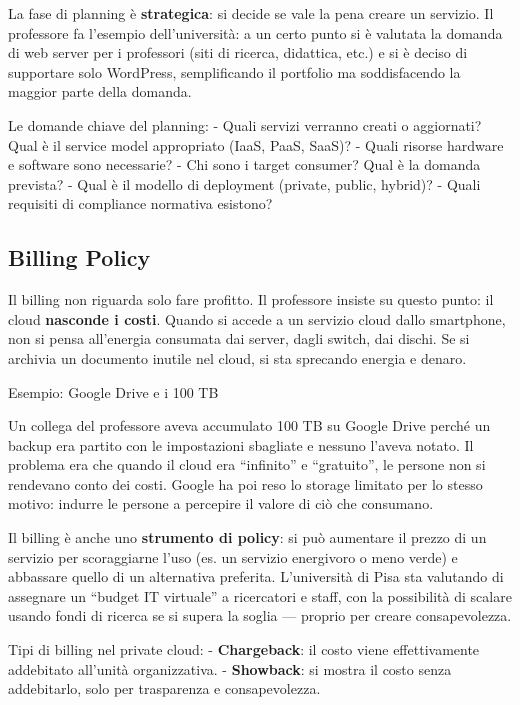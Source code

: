 \documentclass[
  italian,
  openany]{book}
\begin{document}
La fase di planning è \textbf{strategica}: si decide se vale la pena
creare un servizio. Il professore fa l'esempio dell'università: a un
certo punto si è valutata la domanda di web server per i professori
(siti di ricerca, didattica, etc.) e si è deciso di supportare solo
WordPress, semplificando il portfolio ma soddisfacendo la maggior parte
della domanda.

Le domande chiave del planning: - Quali servizi verranno creati o
aggiornati? Qual è il service model appropriato (IaaS, PaaS, SaaS)? -
Quali risorse hardware e software sono necessarie? - Chi sono i target
consumer? Qual è la domanda prevista? - Qual è il modello di deployment
(private, public, hybrid)? - Quali requisiti di compliance normativa
esistono?

\subsection{Billing Policy}\label{billing-policy}

Il billing non riguarda solo fare profitto. Il professore insiste su
questo punto: il cloud \textbf{nasconde i costi}. Quando si accede a un
servizio cloud dallo smartphone, non si pensa all'energia consumata dai
server, dagli switch, dai dischi. Se si archivia un documento inutile
nel cloud, si sta sprecando energia e denaro.

\begin{callouttip}{Esempio: Google Drive e i 100 TB}

Un collega del professore aveva accumulato 100 TB su Google Drive perché
un backup era partito con le impostazioni sbagliate e nessuno l'aveva
notato. Il problema era che quando il cloud era ``infinito'' e
``gratuito'', le persone non si rendevano conto dei costi. Google ha poi
reso lo storage limitato per lo stesso motivo: indurre le persone a
percepire il valore di ciò che consumano.

\end{callouttip}

Il billing è anche uno \textbf{strumento di policy}: si può aumentare il
prezzo di un servizio per scoraggiarne l'uso (es. un servizio energivoro
o meno verde) e abbassare quello di un alternativa preferita.
L'università di Pisa sta valutando di assegnare un ``budget IT
virtuale'' a ricercatori e staff, con la possibilità di scalare usando
fondi di ricerca se si supera la soglia --- proprio per creare
consapevolezza.

Tipi di billing nel private cloud: - \textbf{Chargeback}: il costo viene
effettivamente addebitato all'unità organizzativa. - \textbf{Showback}:
si mostra il costo senza addebitarlo, solo per trasparenza e
consapevolezza.
\end{document}
